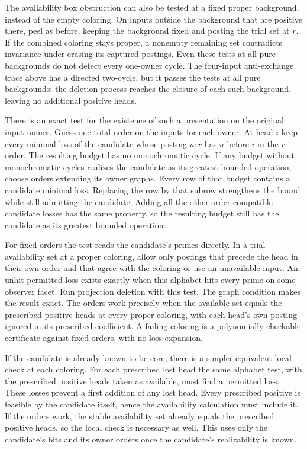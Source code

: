 The availability box obstruction can also be tested
at a fixed proper background, instead of the empty
coloring. On inputs outside the background that
are positive there, peel as before, keeping the
background fixed and posting the trial set at $r$.
If the combined coloring stays proper, a nonempty
remaining set contradicts invariance under erasing
its captured postings. Even these tests at all pure
backgrounds do not detect every one-owner cycle.
The four-input anti-exchange trace above has a directed
two-cycle, but it passes the tests at all pure backgrounds:
the deletion process reaches the closure of each such
background, leaving no additional positive heads.

There is an exact test for the existence of such
a presentation on the original input names. Guess
one total order on the inputs for each owner. At
head $i$ keep every minimal loss of the candidate
whose posting $u:r$ has $u$ before $i$ in the
$r$-order. The resulting budget has no monochromatic
cycle. If any budget without monochromatic cycles
realizes the candidate as its greatest bounded
operation, choose orders extending its owner graphs.
Every row of that budget contains a candidate
minimal loss. Replacing the row by that subrow
strengthens the bound while still admitting the
candidate. Adding all the other order-compatible
candidate losses has the same property, so the
resulting budget still has the candidate as its
greatest bounded operation.

For fixed orders the test reads the candidate's
primes directly. In a trial availability set at a
proper coloring, allow only postings that precede
the head in their own order and that agree with
the coloring or use an unavailable input. An
unhit permitted loss exists exactly when this
alphabet hits every prime on some observer facet.
Run projection deletion with this test. The graph
condition makes the result exact. The orders
work precisely when the available set equals
the prescribed positive heads at every proper
coloring, with each head's own posting ignored in
its prescribed coefficient. A failing coloring is
a polynomially checkable certificate against fixed
orders, with no loss expansion.

If the candidate is already known to be core, there
is a simpler equivalent local check at each coloring.
For each prescribed lost head the same alphabet test,
with the prescribed positive heads taken as available,
must find a permitted loss. These losses prevent a
first addition of any lost head. Every prescribed
positive is feasible by the candidate itself, hence
the availability calculation must include it. If
the orders work, the stable availability set already
equals the prescribed positive heads, so the local
check is necessary as well. This uses only the
candidate's bits and its owner orders once the
candidate's realizability is known.

